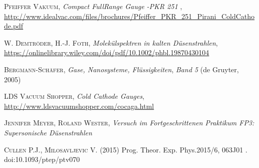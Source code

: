 \documentclass[a4paper,10pt]{article}
\begin{document}
\begin{thebibliography}{99}
\textsc{Pfeiffer Vakuum}, \textit{Compact FullRange Gauge -PKR 251 }, \url{http://www.idealvac.com/files/brochures/Pfeiffer_PKR_251_Pirani_ColdCathode.pdf}

\textsc{W. Demtröder, H.-J. Foth}, \textit{Molekülspektren in kalten Düsenstrahlen}, \url{https://onlinelibrary.wiley.com/doi/pdf/10.1002/phbl.19870430104}

\textsc{Bergmann-Schäfer}, \textit{Gase, Nanosysteme, Flüssigkeiten}, \textit{Band 5} (de Gruyter, 2005)

\textsc{LDS Vacuum Shopper}, \textit{Cold Cathode Gauges}, \url{http://www.ldsvacuumshopper.com/cocaga.html}

\textsc{Jennifer Meyer, Roland Wester}, \textit{Versuch im Fortgeschrittenen Praktikum FP3: Supersonische Düsenstrahlen}

\textsc{Cullen P.J., Milosavljevic V.} (2015) Prog. Theor. Exp. Phys.2015/6, 063J01 . doi:10.1093/ptep/ptv070
\end{thebibliography}
\end{document}
